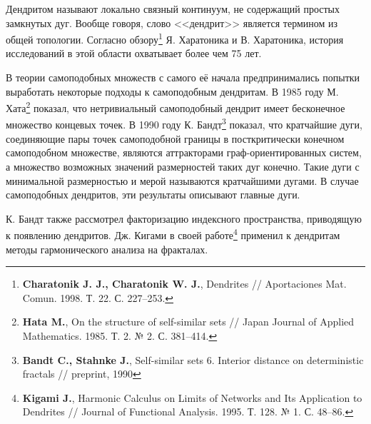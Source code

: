 \documentclass[a5paper,9pt,twoside]{extarticle} %
\begin{document}
Дендритом называют локально связный континуум, не содержащий простых замкнутых дуг.
Вообще говоря, слово <<дендрит>> является термином из общей топологии. 
Согласно обзору\footnote{{\bf Charatonik J. J., Charatonik W. J.}, Dendrites // Aportaciones Mat. Comun. 1998. Т. 22. С. 227--253.} Я. Харатоника и В. Харатоника, история исследований в этой области охватывает более чем 75 лет.

В теории самоподобных множеств с самого её начала предпринимались попытки выработать некоторые подходы к самоподобным дендритам.
В 1985 году М. Хата\footnote{{\bf Hata M.}, On the structure of self-similar sets // Japan Journal of Applied Mathematics. 1985. Т. 2. № 2. С. 381--414.
} показал, что нетривиальный самоподобный дендрит имеет бесконечное множество концевых точек.
В 1990 году К. Бандт\footnote{{\bf Bandt C., Stahnke J.}, Self-similar sets 6. Interior distance on deterministic fractals // preprint, 1990} показал, что кратчайшие дуги, соединяющие пары точек самоподобной границы в посткритически конечном самоподобном множестве, являются аттракторами граф-ориентированных систем, а множество возможных значений размерностей таких дуг конечно.
Такие дуги с минимальной размерностью и мерой называются кратчайшими дугами.
В случае самоподобных дендритов, эти результаты описывают главные дуги.

К. Бандт также рассмотрел факторизацию индексного пространства, приводящую к появлению дендритов.
Дж. Кигами в своей работе\footnote{{\bf Kigami J.}, Harmonic Calculus on Limits of Networks and Its Application to Dendrites // Journal of Functional Analysis. 1995. Т. 128. № 1. С. 48--86.} применил к дендритам методы гармонического анализа на фракталах.
\end{document}
